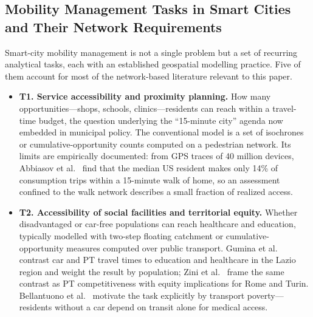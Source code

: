 \documentclass[smartcities,article,submit,moreauthors]{Definitions/mdpi}
\begin{document}
    \subsection{Mobility Management Tasks in Smart Cities and Their Network Requirements}
    \label{subsec:rw-tasks}

    Smart-city mobility management is not a single problem but a set of recurring analytical tasks,
    each with an established geospatial modelling practice.
    Five of them account for most of the network-based literature relevant to this paper.

    \begin{itemize}
        \item \textbf{T1. Service accessibility and proximity planning.}
        How many opportunities---shops, schools, clinics---residents can reach within a travel-time
        budget, the question underlying the ``15-minute city'' agenda now embedded in municipal
        policy. The conventional model is a set of isochrones or cumulative-opportunity counts
        computed on a pedestrian network. Its limits are empirically documented: from GPS traces of
        40 million devices, Abbiasov et al.~\cite{abbiasov2024fifteenmin} find that the median US
        resident makes only 14\% of consumption trips within a 15-minute walk of home, so an
        assessment confined to the walk network describes a small fraction of realized access.

        \item \textbf{T2. Accessibility of social facilities and territorial equity.}
        Whether disadvantaged or car-free populations can reach healthcare and education, typically
        modelled with two-step floating catchment or cumulative-opportunity measures computed over
        public transport. Gumina et al.~\cite{gumina2026mapping} contrast car and PT travel times to
        education and healthcare in the Lazio region and weight the result by population; Zini et
        al.~\cite{zini2024competitiveness} frame the same contrast as PT competitiveness with equity
        implications for Rome and Turin. Bellantuono et al.~\cite{bellantuono2025rome} motivate the
        task explicitly by transport poverty---residents without a car depend on transit alone for
        medical access.


\end{itemize}
\end{document}

